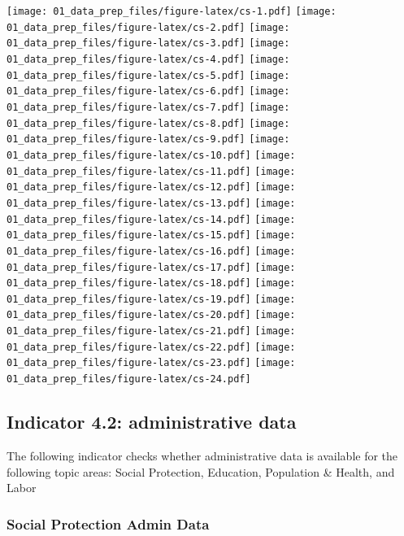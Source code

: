 \documentclass[]{article}
\begin{document}
\texttt{[image: 01\_data\_prep\_files/figure-latex/cs-1.pdf]}
\texttt{[image: 01\_data\_prep\_files/figure-latex/cs-2.pdf]}
\texttt{[image: 01\_data\_prep\_files/figure-latex/cs-3.pdf]}
\texttt{[image: 01\_data\_prep\_files/figure-latex/cs-4.pdf]}
\texttt{[image: 01\_data\_prep\_files/figure-latex/cs-5.pdf]}
\texttt{[image: 01\_data\_prep\_files/figure-latex/cs-6.pdf]}
\texttt{[image: 01\_data\_prep\_files/figure-latex/cs-7.pdf]}
\texttt{[image: 01\_data\_prep\_files/figure-latex/cs-8.pdf]}
\texttt{[image: 01\_data\_prep\_files/figure-latex/cs-9.pdf]}
\texttt{[image: 01\_data\_prep\_files/figure-latex/cs-10.pdf]}
\texttt{[image: 01\_data\_prep\_files/figure-latex/cs-11.pdf]}
\texttt{[image: 01\_data\_prep\_files/figure-latex/cs-12.pdf]}
\texttt{[image: 01\_data\_prep\_files/figure-latex/cs-13.pdf]}
\texttt{[image: 01\_data\_prep\_files/figure-latex/cs-14.pdf]}
\texttt{[image: 01\_data\_prep\_files/figure-latex/cs-15.pdf]}
\texttt{[image: 01\_data\_prep\_files/figure-latex/cs-16.pdf]}
\texttt{[image: 01\_data\_prep\_files/figure-latex/cs-17.pdf]}
\texttt{[image: 01\_data\_prep\_files/figure-latex/cs-18.pdf]}
\texttt{[image: 01\_data\_prep\_files/figure-latex/cs-19.pdf]}
\texttt{[image: 01\_data\_prep\_files/figure-latex/cs-20.pdf]}
\texttt{[image: 01\_data\_prep\_files/figure-latex/cs-21.pdf]}
\texttt{[image: 01\_data\_prep\_files/figure-latex/cs-22.pdf]}
\texttt{[image: 01\_data\_prep\_files/figure-latex/cs-23.pdf]}
\texttt{[image: 01\_data\_prep\_files/figure-latex/cs-24.pdf]}

\hypertarget{indicator-4.2-administrative-data}{%
\subsection{Indicator 4.2: administrative
data}\label{indicator-4.2-administrative-data}}

The following indicator checks whether administrative data is available
for the following topic areas: Social Protection, Education, Population
\& Health, and Labor

\hypertarget{social-protection-admin-data}{%
\subsubsection{Social Protection Admin
Data}\label{social-protection-admin-data}}
\end{document}
